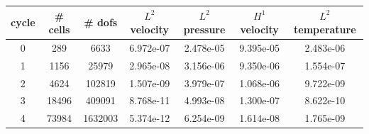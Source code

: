 \documentclass[10pt]{report}
\begin{document}
\begin{table}[H]
\begin{center}
\begin{tabular}{|c|c|c|c|c|c|c|} \hline
cycle & \# cells & \# dofs & $L^2$ velocity & $L^2$ pressure & $H^1$ velocity & $L^2$ temperature\\ \hline
0 & 289 & 6633 & 6.972e-07 & 2.478e-05 & 9.395e-05 & 2.483e-06\\ \hline
1 & 1156 & 25979 & 2.965e-08 & 3.156e-06 & 9.350e-06 & 1.554e-07\\ \hline
2 & 4624 & 102819 & 1.507e-09 & 3.979e-07 & 1.068e-06 & 9.722e-09\\ \hline
3 & 18496 & 409091 & 8.768e-11 & 4.993e-08 & 1.300e-07 & 8.622e-10\\ \hline
4 & 73984 & 1632003 & 5.374e-12 & 6.254e-09 & 1.614e-08 & 1.765e-09\\ \hline
\end{tabular}
\end{center}
\end{table}
\end{document}
